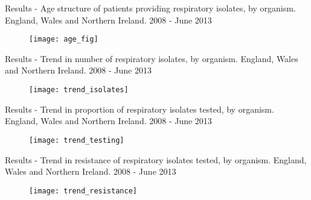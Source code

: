 \documentclass{beamer}
\begin{document}
\begin{frame}{Results - Age structure of patients providing respiratory isolates, by organism. England, Wales and Northern Ireland. 2008 - June 2013}
\begin{figure}
\texttt{[image: age\_fig]}
\end{figure}
\end{frame}

\begin{frame}{Results - Trend in number of respiratory isolates, by organism. England, Wales and Northern Ireland. 2008 - June 2013}
\begin{figure}
\centering
\texttt{[image: trend\_isolates]}
\end{figure}
\end{frame}

\begin{frame}{Results - Trend in proportion of respiratory isolates tested, by organism. England, Wales and Northern Ireland. 2008 - June 2013}
\begin{figure}
\texttt{[image: trend\_testing]}
\end{figure}
\end{frame}

\begin{frame}{Results - Trend in resistance of respiratory isolates tested, by organism. England, Wales and Northern Ireland. 2008 - June 2013} 
\begin{figure}
\texttt{[image: trend\_resistance]}
\end{figure}
\end{frame}
\end{document}
